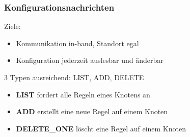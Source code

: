 \documentclass{beamer}
\newcommand{\customitemsep}{7pt}
\begin{document}
\begin{frame}
    \frametitle{Konfigurationsnachrichten}

        Ziele:
            \begin{itemize} \setlength{\itemsep}{\customitemsep}
                \item Kommunikation in-band, Standort egal
                \item Konfiguration jederzeit auslesbar und änderbar
            \end{itemize}

            \pause
        \vspace*{1cm}


        3 Typen ausreichend: LIST, ADD, DELETE
            \begin{itemize} \setlength{\itemsep}{\customitemsep}
                \item \textbf{LIST} fordert alle Regeln eines Knotens an
                \item \textbf{ADD} erstellt eine neue Regel auf einem Knoten
                \item \textbf{DELETE\_ONE} löscht eine Regel auf einem Knoten
            \end{itemize}
\end{frame}
\end{document}
